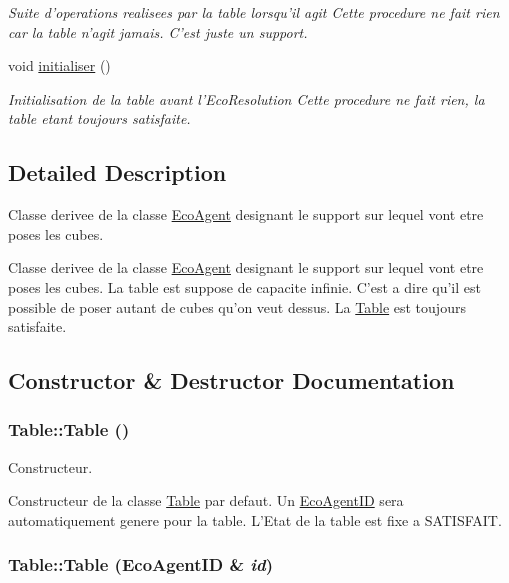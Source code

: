 \begin{CompactItemize}
\begin{CompactList}\small\item\em Suite d'operations realisees par la table lorsqu'il agit Cette procedure ne fait rien car la table n'agit jamais. C'est juste un support. \item\end{CompactList}\item 
\hypertarget{classTable_964952b5f899c8abb64e9622a8457466}{
void \hyperlink{classTable_964952b5f899c8abb64e9622a8457466}{initialiser} ()}
\label{classTable_964952b5f899c8abb64e9622a8457466}

\begin{CompactList}\small\item\em Initialisation de la table avant l'EcoResolution Cette procedure ne fait rien, la table etant toujours satisfaite. \item\end{CompactList}\end{CompactItemize}


\subsection{Detailed Description}
Classe derivee de la classe \hyperlink{classEcoAgent}{EcoAgent} designant le support sur lequel vont etre poses les cubes. 

Classe derivee de la classe \hyperlink{classEcoAgent}{EcoAgent} designant le support sur lequel vont etre poses les cubes. La table est suppose de capacite infinie. C'est a dire qu'il est possible de poser autant de cubes qu'on veut dessus. La \hyperlink{classTable}{Table} est toujours satisfaite. 

\subsection{Constructor \& Destructor Documentation}
\hypertarget{classTable_049f2e06391781ae255c6698869c4ad1}{
\subsubsection[{Table}]{\setlength{\rightskip}{0pt plus 5cm}Table::Table ()}}
\label{classTable_049f2e06391781ae255c6698869c4ad1}


Constructeur. 

Constructeur de la classe \hyperlink{classTable}{Table} par defaut. Un \hyperlink{classEcoAgentID}{EcoAgentID} sera automatiquement genere pour la table. L'Etat de la table est fixe a SATISFAIT. \hypertarget{classTable_f82a6d490aa166537ac2e42e83ec8cd3}{
\subsubsection[{Table}]{\setlength{\rightskip}{0pt plus 5cm}Table::Table ({\bf EcoAgentID} \& {\em id})}}
\label{classTable_f82a6d490aa166537ac2e42e83ec8cd3}



